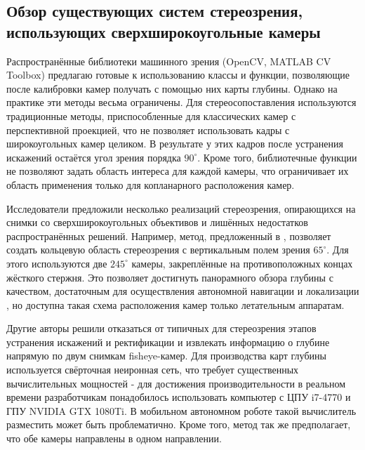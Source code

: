 


\subsection{Обзор существующих систем стереозрения, использующих сверхширокоугольные камеры}

Распространённые библиотеки машинного зрения (OpenCV, MATLAB CV Toolbox) предлагаю готовые к использованию классы и функции, позволяющие после калибровки
камер получать с помощью них карты глубины. Однако на практике эти методы весьма ограничены. Для стереосопоставления 
используются традиционные методы, приспособленные для классических камер с перспективной проекцией, что не позволяет 
использовать кадры с широкоугольных камер целиком. В результате у этих кадров после устранения искажений остаётся 
угол зрения порядка $90^\circ$. Кроме того, библиотечные функции не позволяют задать область интереса для каждой камеры, 
что ограничивает их область применения только для копланарного расположения камер.   

Исследователи предложили несколько реализаций стереозрения, опирающихся на снимки со сверхширокоугольных 
объективов и лишённых недостатков распространённых решений.  
Например, метод, предложенный в \cite{omni_stereo}, позволяет создать кольцевую область стереозрения с вертикальным  %
полем зрения $65^\circ$. Для этого используются две $245^\circ$ камеры, закреплённые на противоположных концах жёсткого стержня.  
Это позволяет достигнуть панорамного обзора глубины с качеством, достаточным для осуществления автономной навигации и
локализации \cite{omni_copter}, но доступна такая схема расположения камер только летательным аппаратам.  

Другие авторы \cite{direct_neuro_stereo} решили отказаться от типичных для стереозрения этапов устранения искажений и ректификации %
и извлекать информацию о глубине напрямую по двум снимкам fisheye-камер. Для производства карт глубины используется 
свёрточная неиронная сеть, что требует существенных вычислительных мощностей - для достижения производительности в реальном 
времени разработчикам понадобилось использовать компьютер с ЦПУ i7-4770 и ГПУ NVIDIA GTX 1080Ti. В мобильном автономном роботе
такой вычислитель разместить может быть проблематично. Кроме того, метод так же предполагает, что обе камеры направлены в одном 
направлении. 


 